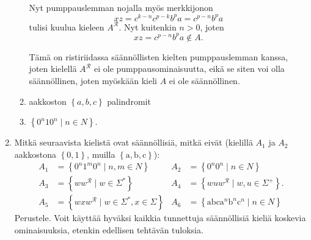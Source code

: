 \documentclass[a4paper,11pt]{article}
\newcommand{\set}[1]{{\left\{ #1 \right\}}}
\begin{document}
\begin{enumerate}
\begin{enumerate}
  Nyt pumppauslemman nojalla myös merkkijonon
  \begin{equation*}
    xz = c^{k-n}c^{p-k}b^pa = c^{p-n}b^pa
  \end{equation*}
  tulisi kuulua kieleen $A^\mathcal{R}$. Nyt kuitenkin $n > 0$, joten
  \begin{equation*}
    xz = c^{p-n}b^pa \notin A.
  \end{equation*}

  Tämä on ristiriidassa säännöllisten kielten pumppauslemman kanssa, joten
  kielellä $A^\mathcal{R}$ ei ole pumppausominaisuutta, eikä se siten voi olla
  säännöllinen, joten myöskään kieli $A$ ei ole säännöllinen.

\item
aakkoston $\set{a,b, c}$ palindromit
\item
$\set{0^n10^n\mid n\in N}$.
\end{enumerate}

\item
  Mitkä seuraavista kielistä ovat säännöllisiä, mitkä
  eivät (kielillä $A_1$ ja $A_2$ aakkostona $\set{0,1}$, muilla
  $\set{\mathrm{a},\mathrm{b},\mathrm{c}}$):
  \begin{align*}
    A_1 &=\set{0^n1^m0^n\mid n,m\in N}
    &A_2 &=\set{0^n0^n\mid n\in N}
    \\
    A_3 &=\set{ww^\mathcal{R}\mid w\in\Sigma^{\ast}}
    &A_4 &=\set{wuw^\mathcal{R}\mid w,u\in\Sigma^+}.
    \\
    A_5 &=\set{wxw^\mathcal{R}\mid w\in\Sigma^{\ast},x\in\Sigma}
    &A_6 &=\set{\mathrm{abc}\mathrm{a}^n\mathrm{b}^n\mathrm{c}^n\mid n\in N}
  \end{align*}
  Perustele. Voit käyttää hyväksi kaikkia tunnettuja säännöllisiä kieliä
  koskevia ominaisuuksia, etenkin edellisen tehtävän tuloksia.



\end{enumerate}
\end{document}
